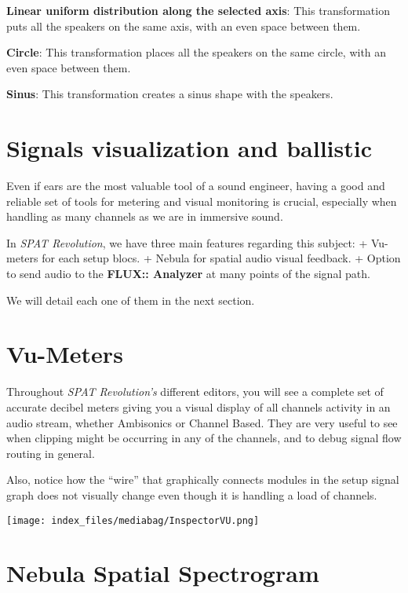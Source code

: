 \documentclass[
  letterpaper,
  DIV=11,
  numbers=noendperiod]{scrreport}
\begin{document}
\textbf{Linear uniform distribution along the selected axis}: This
transformation puts all the speakers on the same axis, with an even
space between them.

\textbf{Circle}: This transformation places all the speakers on the same
circle, with an even space between them.

\textbf{Sinus}: This transformation creates a sinus shape with the
speakers.

\hypertarget{signals-visualization-and-ballistic}{%
\chapter{Signals visualization and
ballistic}\label{signals-visualization-and-ballistic}}

Even if ears are the most valuable tool of a sound engineer, having a
good and reliable set of tools for metering and visual monitoring is
crucial, especially when handling as many channels as we are in
immersive sound.

In \emph{SPAT Revolution}, we have three main features regarding this
subject: + Vu-meters for each setup blocs. + Nebula for spatial audio
visual feedback. + Option to send audio to the \textbf{FLUX:: Analyzer}
at many points of the signal path.

We will detail each one of them in the next section.

\hypertarget{vu-meters}{%
\chapter{Vu-Meters}\label{vu-meters}}

Throughout \emph{SPAT Revolution's} different editors, you will see a
complete set of accurate decibel meters giving you a visual display of
all channels activity in an audio stream, whether Ambisonics or Channel
Based. They are very useful to see when clipping might be occurring in
any of the channels, and to debug signal flow routing in general.

Also, notice how the ``wire'' that graphically connects modules in the
setup signal graph does not visually change even though it is handling a
load of channels.

\texttt{[image: index\_files/mediabag/InspectorVU.png]}

\hypertarget{nebula-spatial-spectrogram}{%
\chapter{Nebula Spatial Spectrogram}\label{nebula-spatial-spectrogram}}
\end{document}

